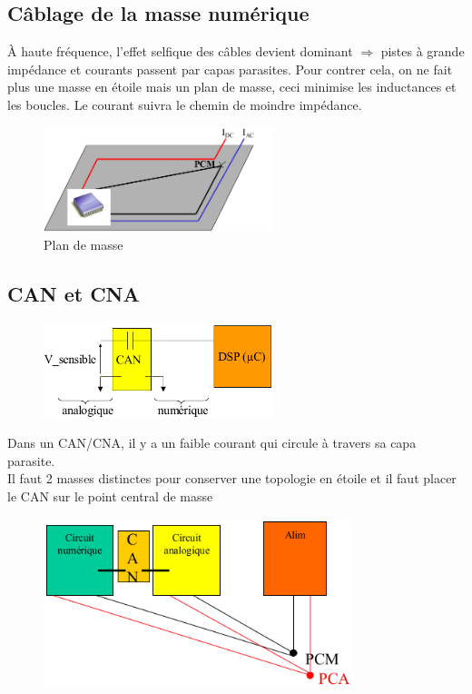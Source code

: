 \subsection{Câblage de la masse numérique}
À haute fréquence, l'effet selfique des câbles devient dominant \(\Rightarrow\) pistes à grande impédance et courants passent par capas parasites. Pour contrer cela, on ne fait plus une masse en étoile mais un plan de masse, ceci minimise les inductances et les boucles. Le courant suivra le chemin de moindre impédance.
\begin{figure}[H] 
	\centering 
	\includegraphics[width=0.6\textwidth,height=10\baselineskip,keepaspectratio]{ch3/image30} 
	\caption{Plan de masse} 
\end{figure}
\subsection{CAN et CNA}
\begin{figure}[H] 
	\centering 
	\includegraphics[width=0.6\textwidth]{ch3/image31} 
\end{figure}
Dans un CAN/CNA, il y a un faible courant qui circule à travers sa capa parasite.\\
Il faut 2 masses distinctes pour conserver une topologie en étoile et il faut placer le CAN sur le point central de masse
\begin{figure}[H] 
	\centering 
	\includegraphics[width=0.8\textwidth,height=10\baselineskip,keepaspectratio]{ch3/image32} 
\end{figure}
